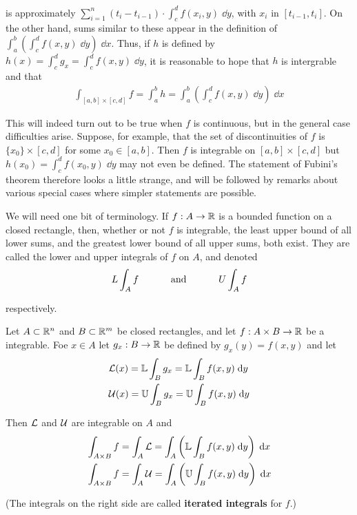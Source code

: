 is approximately $\sum_{i=1}^{n }{(t_i-t_{i-1}) \cdot \int_c^d f(x_i,y)\;\dd y} $, with $x_i$ in 
$[t_{i-1},t_i]$. On the other hand, sums similar to these appear in the definition of 
$\int_a^b\left(\int_c^d f(x, y)\;\dd y\right)\;\dd x$. Thus, if $h$ is defined by 
$h(x) = \int_c^d g_x = \int_c^d f(x, y)\;\dd y$, it is reasonable to hope that $h$ is 
intergrable and that 
\begin{align*}
    \int_{[a,b]\times [c, d]} f  
    = \int_a^b h
    = \int_a^b\left(\int_c^d f(x, y)\;\dd y\right)\;\dd x
\end{align*}

This will indeed turn out to be true when $f$ is continuous, but in the general case difficulties arise.
Suppose, for example, that the set of discontinuities of $f$ is $\{x_0 \} \times [c,d]$ for some
$x_0 \in [a,b]$. Then $f$ is integrable on $[a,b] \times [c,d]$ but $h(x_0) =\int_c^d f(x_0,y)\;\dd y$ 
may not even be defined. The statement of Fubini's theorem therefore looks a little strange, and will be
followed by remarks about various special cases where simpler statements are possible.

We will need one bit of terminology. If $f: A\to  \mathbb{R}$ is a
bounded function on a closed rectangle, then, whether or not
$f$ is integrable, the least upper bound of all lower sums, and
the greatest lower bound of all upper sums, both exist.
They are called the lower and upper integrals of $f$ on $A$, and
denoted 
\begin{align*}
    L \int_A f \text{\hspace*{3em} and \hspace*{3em}} U\int_A f
\end{align*}

respectively. 

\begin{theorem}
    Let $A\subset \mathbb{R}^n$ and $B\subset \mathbb{R}^m$ be closed rectangles, and 
    let $f: A\times B\to \mathbb{R}$ be a integrable. Foe $x\in A$ let $g_x:B\to \mathbb{R}$ be defined 
    by $g_x(y)=f(x, y)$ and let 
    \begin{align*}
        & \mathcal{L}(x) = \mathbb{L}\int_B g_x = \mathbb{L}\int_B f(x, y)\;\mathrm{d} y \\
        & \mathcal{U}(x) = \mathbb{U}\int_B g_x = \mathbb{U}\int_B f(x, y)\;\mathrm{d} y
    \end{align*}

    Then $\mathcal{L}$ and $\mathcal{U}$ are integrable on $A$ and 
    \begin{align*}
        & \int_{A\times B} f = \int_A \mathcal{L} = \int_A \left(\mathbb{L}\int_B f(x, y)\;\mathrm{d} y\right)\;\mathrm{d} x \\
        & \int_{A\times B} f = \int_A \mathcal{U} = \int_A \left(\mathbb{U}\int_B f(x, y)\;\mathrm{d} y\right)\;\mathrm{d} x
    \end{align*}

    \noindent(The integrals on the right side are called \textbf{iterated integrals} for $f$.)
\end{theorem}


